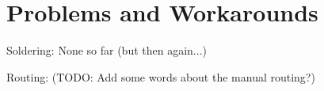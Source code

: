 \section {Problems and Workarounds}

Soldering: None so far (but then again...)

Routing: (TODO: Add some words about the manual routing?)
